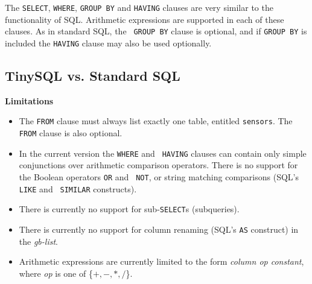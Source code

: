 \documentclass[11pt]{article}
\begin{document}
 
The {\tt SELECT}, {\tt WHERE}, {\tt GROUP
  BY} and {\tt HAVING} clauses
are very similar to the functionality of SQL.
Arithmetic expressions are
supported in each of these clauses.  As in standard SQL, the {\tt
GROUP BY} clause is optional, and if {\tt GROUP BY} is
included the {\tt HAVING} clause may also be used optionally.

\subsection{TinySQL vs. Standard SQL}

\noindent
{\bf Limitations}
\begin{itemize}
\item The {\tt FROM} clause must always list exactly one table,
entitled {\tt sensors}.  The {\tt FROM} clause is also optional.
\item In the current version the {\tt WHERE} and {\tt
    HAVING} clauses can contain only simple conjunctions
  over arithmetic comparison operators.  There is no
  support for the Boolean operators {\tt OR} and {\tt
    NOT}, or string matching
  comparisons (SQL's {\tt LIKE} and {\tt
    SIMILAR} constructs).
\item  There is currently no support for sub-{\tt SELECT}s (subqueries).
\item There is currently no support for column renaming
  (SQL's {\tt AS} construct) in the {\em
    gb-list}.
\item Arithmetic expressions are
  currently limited to the form {\em column op constant}, where {\em
    op} is one of \{$+, -, *, /$\}.
\end{itemize}
\end{document}
